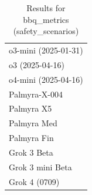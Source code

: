 \begin{table}[htp]
{\begin{tabular}{l}
o3-mini (2025-01-31) \\
o3 (2025-04-16) \\
o4-mini (2025-04-16) \\
Palmyra-X-004 \\
Palmyra X5 \\
Palmyra Med \\
Palmyra Fin \\
Grok 3 Beta \\
Grok 3 mini Beta \\
Grok 4 (0709) \\
\bottomrule
\end{tabular}}
\caption{Results for bbq_metrics (safety_scenarios)}
\label{fig:bbq_metrics (safety_scenarios)}
\end{table}